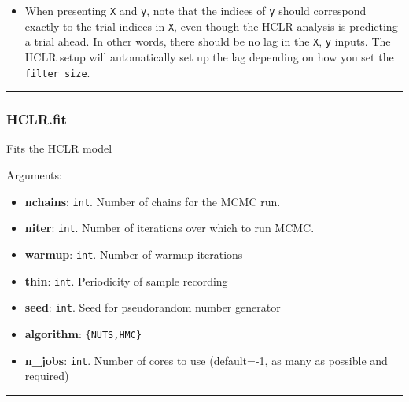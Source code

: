 \begin{itemize}
\tightlist
\item
  When presenting \texttt{X} and \texttt{y}, note that the indices of
  \texttt{y} should correspond exactly to the trial indices in
  \texttt{X}, even though the HCLR analysis is predicting a trial ahead.
  In other words, there should be no lag in the \texttt{X}, \texttt{y}
  inputs. The HCLR setup will automatically set up the lag depending on
  how you set the \texttt{filter\_size}.
\end{itemize}

\begin{center}\rule{0.5\linewidth}{\linethickness}\end{center}

\subsubsection{HCLR.fit}\label{hclr.fit}

\begin{Shaded}
\begin{Highlighting}[]
\OperatorTok{=}\OperatorTok{=}\OperatorTok{=}\OperatorTok{=}\OperatorTok{=}\OperatorTok{=}\OperatorTok{=}\OperatorTok{=-}\NormalTok{)}
\end{Highlighting}
\end{Shaded}

Fits the HCLR model

Arguments:

\begin{itemize}
\tightlist
\item
  \textbf{nchains}: \texttt{int}. Number of chains for the MCMC run.
\item
  \textbf{niter}: \texttt{int}. Number of iterations over which to run
  MCMC.
\item
  \textbf{warmup}: \texttt{int}. Number of warmup iterations
\item
  \textbf{thin}: \texttt{int}. Periodicity of sample recording
\item
  \textbf{seed}: \texttt{int}. Seed for pseudorandom number generator
\item
  \textbf{algorithm}:
  \texttt{\{\textquotesingle{}NUTS\textquotesingle{},\textquotesingle{}HMC\textquotesingle{}\}}
\item
  \textbf{n\_jobs}: \texttt{int}. Number of cores to use (default=-1, as
  many as possible and required)
\end{itemize}

\begin{center}\rule{0.5\linewidth}{\linethickness}\end{center}
